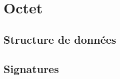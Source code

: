 \section{Octet}

\subsection*{Structure de données}

\begin{algorithme}
    \begin{enregistrement}{\Octet}
    \end{enregistrement}
\end{algorithme}

\subsection*{Signatures}

\begin{algorithme}
\end{algorithme}